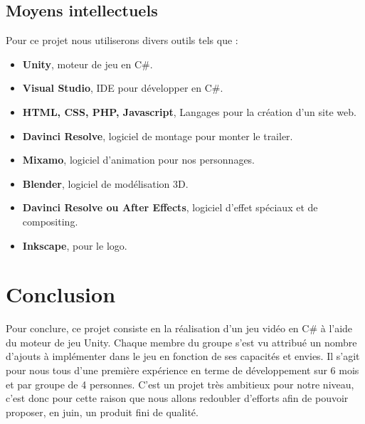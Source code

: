 \documentclass[12pt]{article}
\begin{document}
        \subsection{Moyens intellectuels}
         Pour ce projet nous utiliserons divers outils tels que :
         
            \begin{itemize}
                \setlength{\itemindent}{2em}
                \item \textbf{Unity}, moteur de jeu en C\#.
                \item \textbf{Visual Studio}, IDE pour développer en C\#.
                \item \textbf{HTML, CSS, PHP, Javascript}, Langages pour la création d'un site web.
                \item \textbf{Davinci Resolve}, logiciel de montage pour monter le trailer.
                \item \textbf{Mixamo}, logiciel d'animation pour nos personnages.
                \item \textbf{Blender}, logiciel de modélisation 3D.
                \item \textbf{Davinci Resolve ou After Effects}, logiciel d'effet spéciaux et de compositing.
                \item \textbf{Inkscape}, pour le logo.
            \end{itemize}
        

    \section{Conclusion}
        Pour conclure, ce projet consiste en la réalisation d'un jeu vidéo en C\# à l'aide du moteur de jeu Unity. Chaque membre du groupe s'est vu attribué un nombre d'ajouts à implémenter dans le jeu en fonction de ses capacités et envies. Il s'agit pour nous tous d'une première expérience en terme de développement sur 6 mois et par groupe de 4 personnes. C'est un projet très ambitieux pour notre niveau, c'est donc pour cette raison que nous allons redoubler d'efforts afin de pouvoir proposer, en juin, un produit fini de qualité.
    
\end{document}
